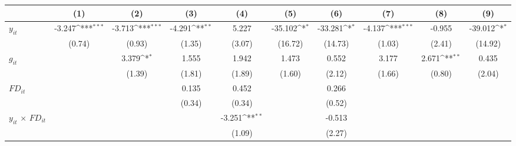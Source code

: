 \documentclass[12pt, a4paper]{article}
\begin{document}
	\begin{table}
	\centering
	\scriptsize
	\setlength\tabcolsep{1pt}	
	\begin{threeparttable}
		{
			\def\sym#1{\ifmmode^{#1}\else\(^{#1}\)\fi}
			\begin{tabular}{l*{9}{c}}
				\hline\hline
				&\multicolumn{1}{c}{(1)}&\multicolumn{1}{c}{(2)}&\multicolumn{1}{c}{(3)}&\multicolumn{1}{c}{(4)}&\multicolumn{1}{c}{(5)}&\multicolumn{1}{c}{(6)}&\multicolumn{1}{c}{(7)}&\multicolumn{1}{c}{(8)}&\multicolumn{1}{c}{(9)}\\
				\hline
				$y_{it}$               &      -3.247\sym{***}&      -3.713\sym{***}&      -4.291\sym{**} &       5.227         &     -35.102\sym{*}  &     -33.281\sym{*}  &      -4.137\sym{***}&      -0.955         &     -39.012\sym{*}  \\
				&      (0.74)         &      (0.93)         &      (1.35)         &      (3.07)         &     (16.72)         &     (14.73)         &      (1.03)         &      (2.41)         &     (14.92)         \\
				$g_{it}$            &                     &       3.379\sym{*}  &       1.555         &       1.942         &       1.473         &       0.552         &       3.177         &       2.671\sym{**} &       0.435         \\
				&                     &      (1.39)         &      (1.81)         &      (1.89)         &      (1.60)         &      (2.12)         &      (1.66)         &      (0.80)         &      (2.04)         \\
				$FD_{it}$                &                     &                     &       0.135         &       0.452         &                     &       0.266         &                     &                     &                     \\
				&                     &                     &      (0.34)         &      (0.34)         &                     &      (0.52)         &                     &                     &                     \\
				$y_{it}$ $\times$ $FD_{it}$ &                     &                     &                     &      -3.251\sym{**} &                     &      -0.513         &                     &                     &                     \\
				&                     &                     &                     &      (1.09)         &                     &      (2.27)         &                     &                     &                     \\

\end{tabular}}
\end{threeparttable}
\end{table}
\end{document}
